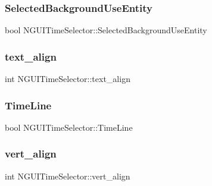 \hypertarget{class_n_g_u_i_time_selector_a40c48442ec834605b0d4dcc61d2705c9}{}\label{class_n_g_u_i_time_selector_a40c48442ec834605b0d4dcc61d2705c9} 
\subsubsection{\texorpdfstring{Selected\+Background\+Use\+Entity}{SelectedBackgroundUseEntity}}
{\footnotesize\ttfamily bool N\+G\+U\+I\+Time\+Selector\+::\+Selected\+Background\+Use\+Entity}

\hypertarget{class_n_g_u_i_time_selector_a34b172fd399d4d7c1c8f54dd77fd8919}{}\label{class_n_g_u_i_time_selector_a34b172fd399d4d7c1c8f54dd77fd8919} 
\subsubsection{\texorpdfstring{text\+\_\+align}{text\_align}}
{\footnotesize\ttfamily int N\+G\+U\+I\+Time\+Selector\+::text\+\_\+align}

\hypertarget{class_n_g_u_i_time_selector_aca01f7fc5adc3e6790d7382bb31d7758}{}\label{class_n_g_u_i_time_selector_aca01f7fc5adc3e6790d7382bb31d7758} 
\subsubsection{\texorpdfstring{Time\+Line}{TimeLine}}
{\footnotesize\ttfamily bool N\+G\+U\+I\+Time\+Selector\+::\+Time\+Line}

\hypertarget{class_n_g_u_i_time_selector_a058d6236e87bc3af9d8bf468551ea455}{}\label{class_n_g_u_i_time_selector_a058d6236e87bc3af9d8bf468551ea455} 
\subsubsection{\texorpdfstring{vert\+\_\+align}{vert\_align}}
{\footnotesize\ttfamily int N\+G\+U\+I\+Time\+Selector\+::vert\+\_\+align}


